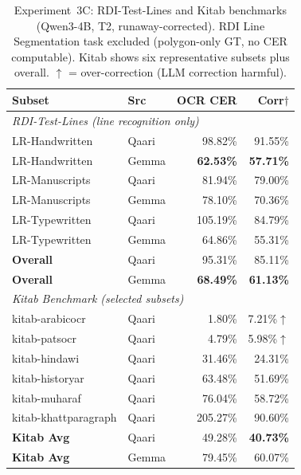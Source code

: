 \documentclass[conference]{IEEEtran}
\begin{document}
\begin{table}[t]
\caption{Experiment~3C: RDI-Test-Lines and Kitab benchmarks
(Qwen3-4B, T2, runaway-corrected). RDI Line Segmentation task excluded
(polygon-only GT, no CER computable). Kitab shows six representative
subsets plus overall. $\uparrow$ = over-correction (LLM correction harmful).}
\label{tab:exp3_gen}
\begin{center}
\small
\begin{tabular}{llrr}
\toprule
\textbf{Subset} & \textbf{Src} & \textbf{OCR CER} & \textbf{Corr$\dagger$} \\
\midrule
\multicolumn{4}{l}{\textit{RDI-Test-Lines (line recognition only)}} \\
LR-Handwritten  & Qaari &  98.82\% &  91.55\% \\
LR-Handwritten  & Gemma & \textbf{62.53\%} & \textbf{57.71\%} \\
LR-Manuscripts  & Qaari &  81.94\% &  79.00\% \\
LR-Manuscripts  & Gemma &  78.10\% &  70.36\% \\
LR-Typewritten  & Qaari & 105.19\% &  84.79\% \\
LR-Typewritten  & Gemma &  64.86\% &  55.31\% \\
\textbf{Overall}& Qaari &  95.31\% &  85.11\% \\
\textbf{Overall}& Gemma & \textbf{68.49\%} & \textbf{61.13\%} \\
\midrule
\multicolumn{4}{l}{\textit{Kitab Benchmark (selected subsets)}} \\
kitab-arabicocr      & Qaari &   1.80\% &   7.21\%$\uparrow$ \\
kitab-patsocr        & Qaari &   4.79\% &   5.98\%$\uparrow$ \\
kitab-hindawi        & Qaari &  31.46\% &  24.31\% \\
kitab-historyar      & Qaari &  63.48\% &  51.69\% \\
kitab-muharaf        & Qaari &  76.04\% &  58.72\% \\
kitab-khattparagraph & Qaari & 205.27\% &  90.60\% \\
\textbf{Kitab Avg}   & Qaari &  49.28\% & \textbf{40.73\%} \\
\textbf{Kitab Avg}   & Gemma &  79.45\% &  60.07\% \\
\bottomrule
\end{tabular}
\end{center}
\end{table}

\end{document}

